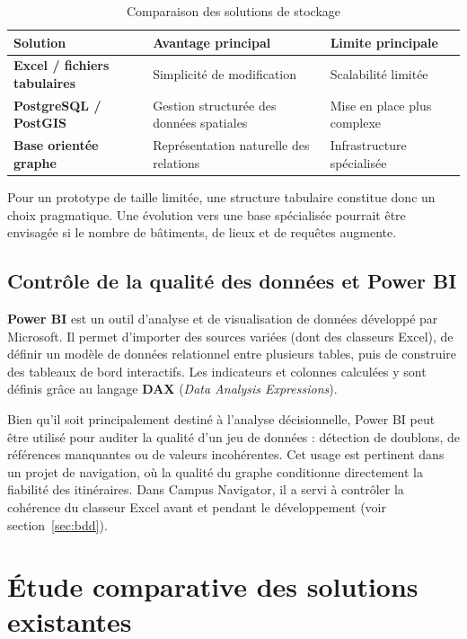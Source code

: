 \documentclass[12pt,a4paper]{report}
\begin{document}
\begin{table}[h]
\centering
\caption{Comparaison des solutions de stockage}
\label{tab:stockage}
\small
\begin{tabularx}{\linewidth}{@{}lXX@{}}
\toprule
\textbf{Solution} & \textbf{Avantage principal} & \textbf{Limite principale}\\
\midrule
\textbf{Excel / fichiers tabulaires} & Simplicité de modification & Scalabilité limitée\\
\textbf{PostgreSQL / PostGIS} & Gestion structurée des données spatiales & Mise en place plus complexe\\
\textbf{Base orientée graphe} & Représentation naturelle des relations & Infrastructure spécialisée\\
\bottomrule
\end{tabularx}
\end{table}

Pour un prototype de taille limitée, une structure tabulaire constitue donc un choix pragmatique.
Une évolution vers une base spécialisée pourrait être envisagée si le nombre de bâtiments, de lieux
et de requêtes augmente.

\subsection{Contrôle de la qualité des données et Power BI}

\textbf{Power BI} est un outil d'analyse et de visualisation de données développé par Microsoft.
Il permet d'importer des sources variées (dont des classeurs Excel), de définir un modèle de données
relationnel entre plusieurs tables, puis de construire des tableaux de bord interactifs. Les
indicateurs et colonnes calculées y sont définis grâce au langage \textbf{DAX} (\emph{Data Analysis
Expressions}).

Bien qu'il soit principalement destiné à l'analyse décisionnelle, Power BI peut être utilisé pour
auditer la qualité d'un jeu de données : détection de doublons, de références manquantes ou de
valeurs incohérentes. Cet usage est pertinent dans un projet de navigation, où la qualité du graphe
conditionne directement la fiabilité des itinéraires. Dans Campus Navigator, il a servi à contrôler
la cohérence du classeur Excel avant et pendant le développement (voir section~\ref{sec:bdd}).

\section{Étude comparative des solutions existantes}
\end{document}
